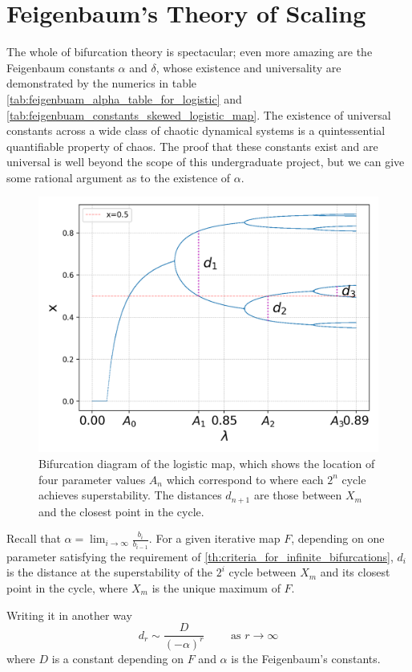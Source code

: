 \section{Feigenbaum's Theory of Scaling}

The whole of bifurcation theory is spectacular; even more amazing are the Feigenbaum constants $\alpha$ and $\delta$, whose existence and universality are demonstrated by the numerics in table \ref{tab:feigenbuam_alpha_table_for_logistic} and \ref{tab:feigenbuam_constants_skewed_logistic_map}. 
The existence of universal constants across a wide class of chaotic dynamical systems is a quintessential quantifiable property of chaos.
The proof that these constants exist and are universal is well beyond the scope of this undergraduate project, but we can give some rational argument as to the existence of $\alpha$.

\begin{figure}
    \centering
    \includegraphics[width=0.6\linewidth]{Images/demonstration of feigenbaum constants.png}
    \caption{Bifurcation diagram of the logistic map, which shows the location of four parameter values $A_n$ which correspond to where each $2^n$ cycle achieves superstability. The distances $d_{n+1}$ are those between $X_m$ and the closest point in the cycle.}
	\label{fig: universal raito}
\end{figure} 

Recall that $\alpha = \lim_{i \rightarrow  \infty}\frac{b_i}{b_{i-1}}$. 
For a given iterative map $F$, depending on one parameter satisfying the requirement of \ref{th:criteria_for_infinite_bifurcations}, $d_i$ is the distance at the superstability of the $2^{i}$ cycle between $X_{m}$ and its closest point in the cycle, where $X_m$ is the unique maximum of $F$.

Writing it in another way
\begin{equation}\label{eq:d_sim}
d_r \sim\frac{D}{(-\alpha)^r} \quad \quad \text{ as } r \to \infty
\end{equation}
where $D$ is a constant depending on $F$ and $\alpha$ is the Feigenbaum's constants. 

